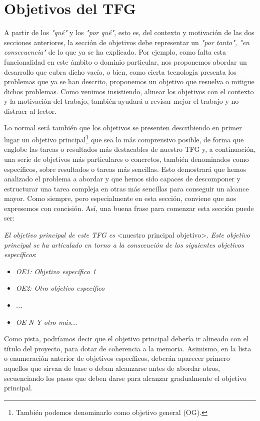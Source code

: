 \section{Objetivos del TFG}
A partir de los \textit{"qué"} y los \textit{"por qué"}, esto es, del contexto y motivación de las dos secciones anteriores, la sección de objetivos debe representar un \textit{"por tanto", "en consecuencia"} de lo que ya se ha explicado. Por ejemplo, como falta esta funcionalidad en este ámbito o dominio particular, nos proponemos abordar un desarrollo que cubra dicho vacío, o bien, como cierta tecnología presenta los problemas que ya se han descrito, proponemos un objetivo que resuelva o mitigue dichos problemas. Como venimos insistiendo, alinear los objetivos con el contexto y la motivación del trabajo, también ayudará a revisar mejor el trabajo y no distraer al lector.

Lo normal será también que los objetivos se presenten describiendo en primer lugar un objetivo principal\footnote{También podemos denominarlo como objetivo general (OG).} que sea lo más comprensivo posible, de forma que englobe las tareas o resultados más destacables de nuestro TFG y,  a continuación, una serie de objetivos más particulares o concretos, también denominados como específicos, sobre resultados o tareas más sencillas. Esto demostrará que hemos analizado el problema a abordar y que hemos sido capaces de descomponer y estructurar una tarea compleja en otras más sencillas para conseguir un alcance mayor. Como siempre, pero especialmente en esta sección, conviene que nos expresemos con concisión. Así, una buena frase para comenzar esta sección puede ser:

\textit{El objetivo principal de este TFG es } \textless nuestro principal objetivo\textgreater. \textit{Este objetivo principal se ha articulado en torno a la consecución de los siguientes objetivos específicos}:
\begin{itemize}
  \item \textit{OE1: Objetivo específico 1}
  \item \textit{OE2: Otro objetivo específico}
  \item \textit{...}
  \item \textit{OE N Y otro más...}
\end{itemize}

Como pista, podríamos decir que el objetivo principal debería ir alineado con el título del proyecto, para dotar de coherencia a la memoria. Asimismo, en la lista o enumeración anterior de objetivos específicos, deberán aparecer primero aquellos que sirvan de base o deban alcanzarse antes de abordar otros, secuenciando los pasos que deben darse para alcanzar gradualmente el objetivo principal.

